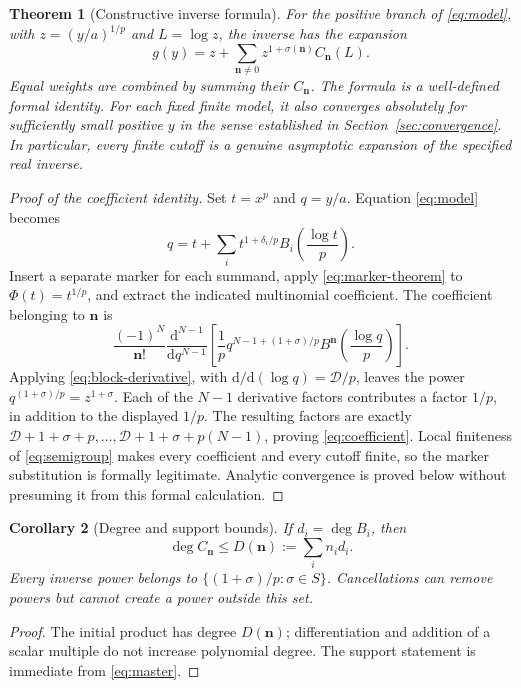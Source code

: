 \documentclass[11pt,a4paper]{article}
\numberwithin{equation}{section}
\newtheorem{theorem}{Theorem}[section]
\newtheorem{corollary}[theorem]{Corollary}
\theoremstyle{definition}
\theoremstyle{remark}
\newcommand{\dd}{\mathrm d}
\newcommand{\D}{\mathcal D}
\begin{document}
\begin{theorem}[Constructive inverse formula]
For the positive branch of \eqref{eq:model}, with $z=(y/a)^{1/p}$ and
$L=\log z$, the inverse has the expansion
\begin{equation}
 \boxed{\displaystyle
 g(y)=z+\sum_{\boldsymbol n\ne0}
          z^{1+\sigma(\boldsymbol n)}C_{\boldsymbol n}(L).}
 \label{eq:master}
\end{equation}
Equal weights are combined by summing their $C_{\boldsymbol n}$.
The formula is a well-defined formal identity. For each fixed finite model,
it also converges absolutely for sufficiently small positive $y$ in the
sense established in Section~\ref{sec:convergence}. In particular, every
finite cutoff is a genuine asymptotic expansion of the specified real
inverse.
\end{theorem}
\begin{proof}[Proof of the coefficient identity]
Set $t=x^p$ and $q=y/a$. Equation \eqref{eq:model} becomes
\[
 q=t+\sum_i t^{1+\delta_i/p} B_i\left(\frac{\log t}{p}\right).
\]
Insert a separate marker for each summand, apply
\eqref{eq:marker-theorem} to $\Phi(t)=t^{1/p}$, and extract the indicated
multinomial coefficient. The coefficient belonging to $\boldsymbol n$ is
\begin{equation}
 \frac{(-1)^N}{\boldsymbol n!}
 \frac{\dd^{N-1}}{\dd q^{N-1}}
 \left[\frac1p q^{N-1+(1+\sigma)/p}
 B^{\boldsymbol n}\left(\frac{\log q}{p}\right)\right].
 \label{eq:raw-coefficient}
\end{equation}
Applying \eqref{eq:block-derivative}, with
$\dd/\dd(\log q)=\D/p$, leaves the power
$q^{(1+\sigma)/p}=z^{1+\sigma}$. Each of the $N-1$ derivative factors
contributes a factor $1/p$, in addition to the displayed $1/p$.
The resulting factors are exactly
$\D+1+\sigma+p,\ldots,\D+1+\sigma+p(N-1)$, proving
\eqref{eq:coefficient}. Local finiteness of \eqref{eq:semigroup} makes every
coefficient and every cutoff finite, so the marker substitution is formally
legitimate. Analytic convergence is proved below without presuming it from
this formal calculation.
\end{proof}

\begin{corollary}[Degree and support bounds]
If $d_i=\deg B_i$, then
\begin{equation}
 \deg C_{\boldsymbol n}\le D(\boldsymbol n):=\sum_i n_i d_i.
 \label{eq:degree-bound}
\end{equation}
Every inverse power belongs to
$\{(1+\sigma)/p:\sigma\in S\}$. Cancellations can remove powers but cannot
create a power outside this set.
\end{corollary}
\begin{proof}
The initial product has degree $D(\boldsymbol n)$; differentiation and
addition of a scalar multiple do not increase polynomial degree.
The support statement is immediate from \eqref{eq:master}.
\end{proof}
\end{document}
